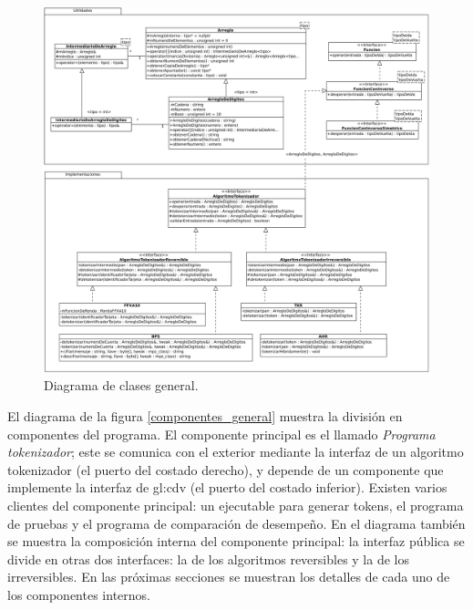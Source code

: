 \begin{figure}
  \begin{center}
    \includegraphics[width=1.0\linewidth]{diagramas/diagrama_general.png}
    \caption{Diagrama de clases general.}
    \label{clases_general}
  \end{center}
\end{figure}

El diagrama de la figura \ref{componentes_general} muestra la división en
componentes del programa. El componente principal es el llamado
\textit{Programa tokenizador}; este se comunica con el exterior mediante la
interfaz de un algoritmo tokenizador (el puerto del costado derecho), y depende
de un componente que implemente la interfaz de \gls{gl:cdv} (el puerto del
costado inferior). Existen varios clientes del componente principal: un
ejecutable para generar tokens, el programa de pruebas y el programa de
comparación de desempeño. En el diagrama también se muestra la composición
interna del componente principal: la interfaz pública se divide en otras dos
interfaces: la de los algoritmos reversibles y la de los irreversibles. En las
próximas secciones se muestran los detalles de cada uno de los componentes
internos.

